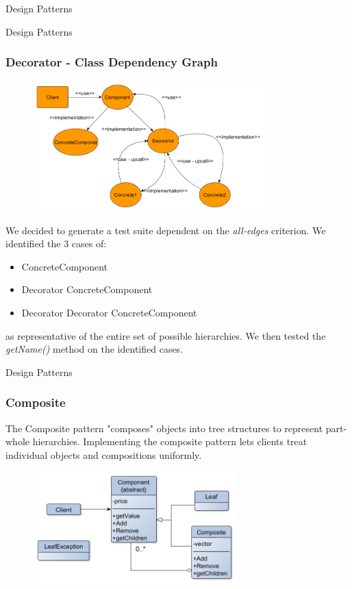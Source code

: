 \documentclass{beamer}
\begin{document}
\begin{section}{Design Patterns}
\begin{subsection}{Design Patterns}
	\begin{frame}
		\frametitle{Decorator - Class Dependency Graph}
\begin{figure}[!h]
	\centering
	\includegraphics[width=0.8\textwidth]{./Decorator/ClassDepencyGraph.png}
	\label{Dedepengraph}
\end{figure}
{\footnotesize We decided to generate a test suite dependent on the \textit{all-edges} criterion.
We identified the 3 cases of:}
\begin{itemize}
	\item ConcreteComponent
	\item Decorator ConcreteComponent
	\item Decorator Decorator ConcreteComponent
	
\end{itemize}
{\footnotesize as representative of the entire set of possible hierarchies.
We then tested the \textit{getName()} method on the identified cases.} 		
	\end{frame}
\end{subsection}

\begin{subsection}{Design Patterns}
	\begin{frame}
		\frametitle{Composite}
The Composite pattern "composes" objects into tree structures to represent part-whole hierarchies. Implementing the composite pattern lets clients treat individual objects and compositions uniformly.

\begin{figure}[!h]
	\centering
	\includegraphics[width=0.7\textwidth]{./Composite/ClassDiagram.png}
	\label{CoclassDiag}
\end{figure}
		

\end{frame}
\end{subsection}
\end{section}
\end{document}
